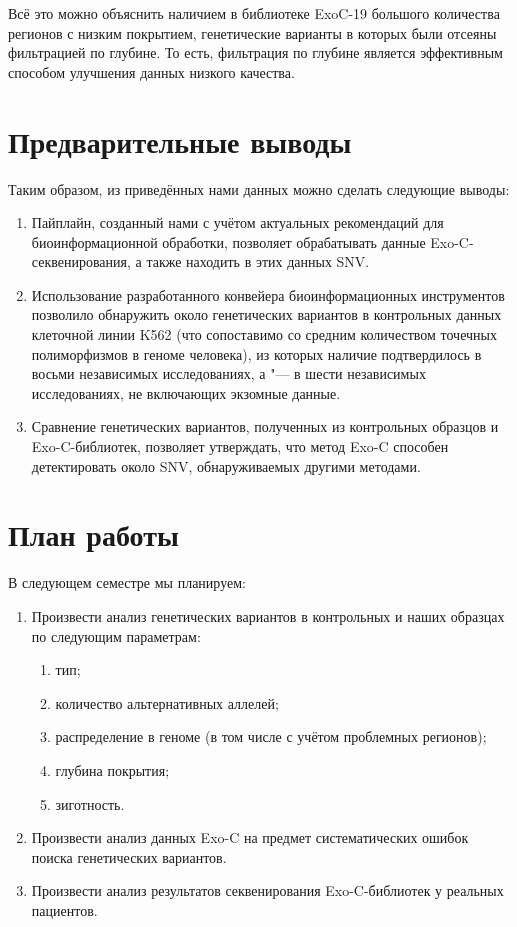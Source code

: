 \documentclass[a4paper,14pt]{extarticle}
\newcommand{\thousands}{тыс.}
\newcommand{\mln}{млн}
\begin{document}
Всё это можно объяснить наличием в библиотеке ExoC-19 большого количества регионов с низким покрытием, генетические варианты в которых были отсеяны фильтрацией по глубине.
То есть, фильтрация по глубине является эффективным способом улучшения данных низкого качества.

\section{Предварительные выводы}

Таким образом, из приведённых нами данных можно сделать следующие выводы:

\begin{enumerate}
	\item Пайплайн, созданный нами с учётом актуальных рекомендаций для биоинформационной обработки, позволяет обрабатывать данные Exo-C\hyp{}секвенирования, а также находить в этих данных SNV.
	\item Использование разработанного конвейера биоинформационных инструментов позволило обнаружить около \numprint[\mln]{5.5} генетических вариантов в контрольных данных клеточной линии K562 (что сопоставимо со средним количеством точечных полиморфизмов в геноме человека), из которых наличие \numprint[\thousands]{75} подтвердилось в восьми независимых исследованиях, а \numprint[\mln]{1} "--- в шести независимых исследованиях, не включающих экзомные данные.
	\item Сравнение генетических вариантов, полученных из контрольных образцов и Exo-C\hyp{}библиотек, позволяет утверждать, что метод Exo-C способен детектировать около  SNV, обнаруживаемых другими методами.
\end{enumerate}

\section{План работы}

В следующем семестре мы планируем:

\begin{enumerate}
	\item Произвести анализ генетических вариантов в контрольных и наших образцах по следующим параметрам:
	      \begin{enumerate}
		      \item тип;
		      \item количество альтернативных аллелей;
		      \item распределение в геноме (в том числе с учётом проблемных регионов);
		      \item глубина покрытия;
		      \item зиготность.
	      \end{enumerate}

	\item Произвести анализ данных Exo-C на предмет систематических ошибок поиска генетических вариантов.

	\item Произвести анализ результатов секвенирования Exo-C\hyp{}библиотек у реальных пациентов.

\end{enumerate}
\end{document}
